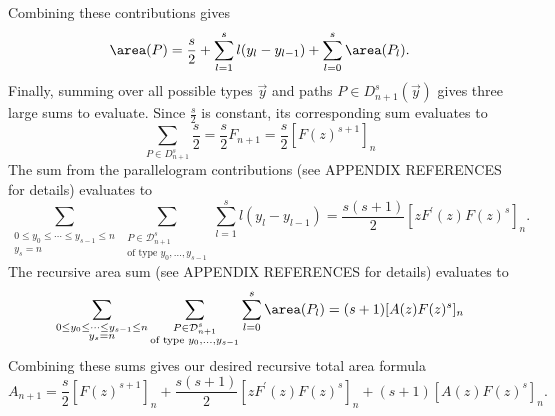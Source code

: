 \documentclass[12pt]{article}
\begin{document}
\noindent Combining these contributions gives
\begin{equation*}
  \area(P) = \frac{s}{2} + \sum_{l=1}^{s} l(y_{l}-y_{l-1}) + \sum_{l=0}^{s}\area(P_{l}).
\end{equation*}
Finally, summing over all possible types $ \vec{y} $ and paths $ P\in D_{n+1}^{s}(\vec{y}) $ gives three large sums to evaluate. Since $ \frac{s}{2} $ is constant, its corresponding sum evaluates to
\[
  \sum_{P\in D_{n+1}^{s}}\frac{s}{2} = \frac{s}{2}F_{n+1} = \frac{s}{2}[F(z)^{s+1}]_{n} 
\]
\noindent The sum from the parallelogram contributions (see APPENDIX REFERENCES for details) evaluates to 
\begin{equation}
  \sum_{\substack{0\leq y_{0}\leq \cdots\leq y_{s-1}\leq n\\y_{s}=n}} \sum_{\substack{P\in \mathcal{D}_{n+1}^{s}\\\text{of type }y_{0},\ldots, y_{s-1}}}\sum_{l=1}^{s} l(y_{l}-y_{l-1}) = \frac{s(s+1)}{2}[zF^{\prime}(z)F(z)^{s}]_{n}.
\end{equation}
\noindent The recursive area sum (see APPENDIX REFERENCES for details) evaluates to 
\begin{equation}
  \sum_{\substack{0\leq y_{0}\leq \cdots\leq y_{s-1}\leq n\\y_{s}=n}} \sum_{\substack{P\in \mathcal{D}_{n+1}^{s}\\\text{of type }y_{0},\ldots, y_{s-1}}}  \sum_{l=0}^{s}\area(P_{l}) = (s+1)[A(z)F(z)^{s}]_{n}
\end{equation}
Combining these sums gives our desired recursive total area formula
\begin{equation}
  A_{n+1} =\frac{s}{2}[F(z)^{s+1}]_{n} + \frac{s(s+1)}{2}[zF^{\prime}(z)F(z)^{s}]_{n}+ (s+1)[A(z)F(z)^{s}]_{n}.
\end{equation}
\end{document}
